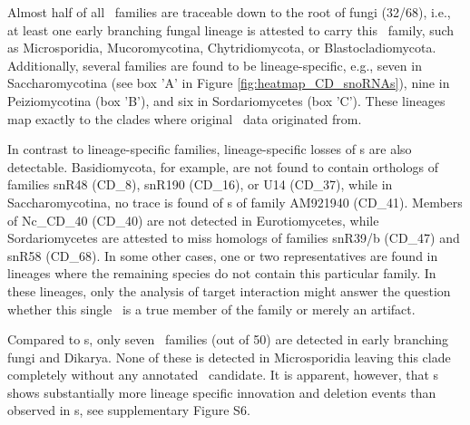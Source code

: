 Almost half of all \cd\ families are traceable down to the root of
fungi (32/68), i.e., at least one early branching fungal lineage is
attested to carry this \sno\ family, such as Microsporidia,
Mucoromycotina, Chytridiomycota, or Blastocladiomycota. Additionally,
several families are found to be lineage-specific, e.g., seven in
Saccharomycotina (see box 'A' in Figure \ref{fig:heatmap_CD_snoRNAs}),
nine in Peiziomycotina (box 'B'), and six in Sordariomycetes (box
'C'). These lineages map exactly to the clades where original \sno\
data originated from.


In contrast to lineage-specific families, lineage-specific losses of
\sno s are also detectable. Basidiomycota, for example, are not found
to contain orthologs of families snR48 (CD\_8), snR190 (CD\_16), or
U14 (CD\_37), while in Saccharomycotina, no trace is found of \sno s
of family AM921940 (CD\_41). Members of Nc\_CD\_40 (CD\_40) are not
detected in Eurotiomycetes, while Sordariomycetes are attested to miss
homologs of families snR39/b (CD\_47) and snR58 (CD\_68). In some
other cases, one or two representatives are found in lineages where
the remaining species do not contain this particular family. In these
lineages, only the analysis of target interaction might answer the
question whether this single \sno\ is a true member of the family or
merely an artifact.


%

Compared to \cd s, only seven \haca\ families (out of 50) are detected
in early branching fungi and Dikarya. None of these is detected in
Microsporidia leaving this clade completely without any annotated
\sno\ candidate. It is apparent, however, that \haca s shows
substantially more lineage specific innovation and deletion events
than observed in \cd s, see supplementary Figure S6.

